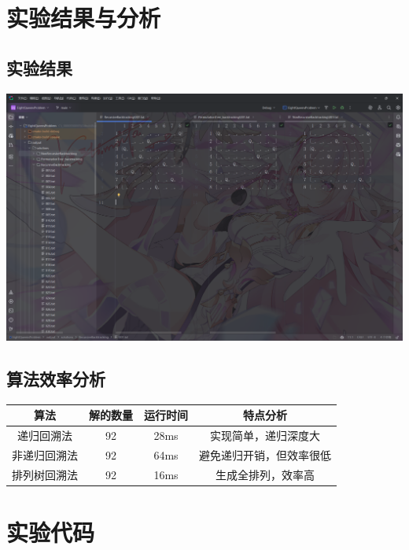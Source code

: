 \documentclass[12pt, a4paper, oneside]{ctexart}
\begin{document}
\section{实验结果与分析}

\subsection{实验结果}

\includegraphics[width=\textwidth]{../images/实验结果.png}\\[0.5em]

\subsection{算法效率分析}

\begin{table}[H]
\centering
\begin{tabular}{|c|c|c|c|}
\hline 
算法         & 解的数量 & 运行时间 & 特点分析                 \\ \hline
递归回溯法   & 92       & 28ms     & 实现简单，递归深度大     \\ \hline
非递归回溯法 & 92       & 64ms     & 避免递归开销，但效率很低 \\ \hline
排列树回溯法 & 92       & 16ms     & 生成全排列，效率高       \\ \hline
\end{tabular}
\end{table}

\section{实验代码}
\end{document}
